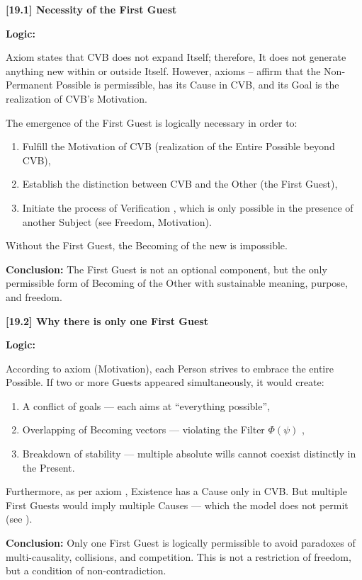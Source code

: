 \documentclass[12pt]{article}
\begin{document}
\textbf{[19.1] Necessity of the First Guest}

\textbf{Logic:}

Axiom \text{[13]} states that CVB does not expand Itself; therefore, It does not generate anything new within or outside Itself. However, axioms \text{[14]}–\text{[17]} affirm that the Non-Permanent Possible is permissible, has its Cause in CVB, and its Goal is the realization of CVB’s Motivation.

The emergence of the First Guest is logically necessary in order to:
\begin{enumerate}
\item Fulfill the Motivation of CVB (realization of the Entire Possible beyond CVB),
\item Establish the distinction between CVB and the Other (the First Guest),
\item Initiate the process of Verification \text{[11.6]}, which is only possible in the presence of another Subject (see \text{[12.2]} Freedom, \text{[12.3]} Motivation).
\end{enumerate}

Without the First Guest, the Becoming of the new is impossible.

\textbf{Conclusion:} The First Guest is not an optional component, but the only permissible form of Becoming of the Other with sustainable meaning, purpose, and freedom.

\bigskip

\textbf{[19.2] Why there is only one First Guest}

\textbf{Logic:}

According to axiom \text{[12.3]} (Motivation), each Person strives to embrace the entire Possible. If two or more Guests appeared simultaneously, it would create:
\begin{enumerate}
\item A conflict of goals — each aims at ``everything possible'',
\item Overlapping of Becoming vectors — violating the Filter $\Phi(\psi)$ \text{[11.1.1]},
\item Breakdown of stability — multiple absolute wills cannot coexist distinctly in the Present.
\end{enumerate}

Furthermore, as per axiom \text{[6]}, Existence has a Cause only in CVB. But multiple First Guests would imply multiple Causes — which the model does not permit (see \text{[11.1]}).

\textbf{Conclusion:} Only one First Guest is logically permissible to avoid paradoxes of multi-causality, collisions, and competition. This is not a restriction of freedom, but a condition of non-contradiction.
\end{document}
